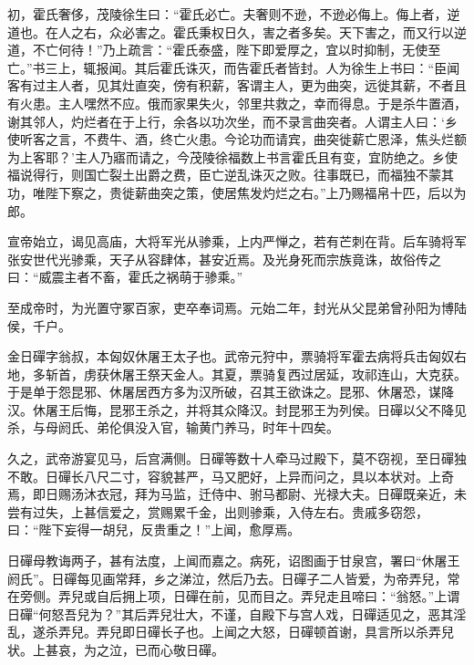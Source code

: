 \documentclass[12pt,UTF8]{ctexbook}
\begin{document}
初，霍氏奢侈，茂陵徐生曰：“霍氏必亡。夫奢则不逊，不逊必侮上。侮上者，逆道也。在人之右，众必害之。霍氏秉权日久，害之者多矣。天下害之，而又行以逆道，不亡何待！”乃上疏言：“霍氏泰盛，陛下即爱厚之，宜以时抑制，无使至亡。”书三上，辄报闻。其后霍氏诛灭，而告霍氏者皆封。人为徐生上书曰：“臣闻客有过主人者，见其灶直突，傍有积薪，客谓主人，更为曲突，远徙其薪，不者且有火患。主人嘿然不应。俄而家果失火，邻里共救之，幸而得息。于是杀牛置酒，谢其邻人，灼烂者在于上行，余各以功次坐，而不录言曲突者。人谓主人曰：‘乡使听客之言，不费牛、酒，终亡火患。今论功而请宾，曲突徙薪亡恩泽，焦头烂额为上客耶？’主人乃寤而请之，今茂陵徐福数上书言霍氏且有变，宜防绝之。乡使福说得行，则国亡裂土出爵之费，臣亡逆乱诛灭之败。往事既已，而福独不蒙其功，唯陛下察之，贵徙薪曲突之策，使居焦发灼烂之右。”上乃赐福帛十匹，后以为郎。



宣帝始立，谒见高庙，大将军光从骖乘，上内严惮之，若有芒刺在背。后车骑将军张安世代光骖乘，天子从容肆体，甚安近焉。及光身死而宗族竟诛，故俗传之曰：“威震主者不畜，霍氏之祸萌于骖乘。”



至成帝时，为光置守冢百家，吏卒奉词焉。元始二年，封光从父昆弟曾孙阳为博陆侯，千户。



金日磾字翁叔，本匈奴休屠王太子也。武帝元狩中，票骑将军霍去病将兵击匈奴右地，多斩首，虏获休屠王祭天金人。其夏，票骑复西过居延，攻祁连山，大克获。于是单于怨昆邪、休屠居西方多为汉所破，召其王欲诛之。昆邪、休屠恐，谋降汉。休屠王后悔，昆邪王杀之，并将其众降汉。封昆邪王为列侯。日磾以父不降见杀，与母阏氏、弟伦俱没入官，输黄门养马，时年十四矣。



久之，武帝游宴见马，后宫满侧。日磾等数十人牵马过殿下，莫不窃视，至日磾独不敢。日磾长八尺二寸，容貌甚严，马又肥好，上异而问之，具以本状对。上奇焉，即日赐汤沐衣冠，拜为马监，迁侍中、驸马都尉、光禄大夫。日磾既亲近，未尝有过失，上甚信爱之，赏赐累千金，出则骖乘，入侍左右。贵戚多窃怨，曰：“陛下妄得一胡兒，反贵重之！”上闻，愈厚焉。



日磾母教诲两子，甚有法度，上闻而嘉之。病死，诏图画于甘泉宫，署曰“休屠王阏氏”。日磾每见画常拜，乡之涕泣，然后乃去。日磾子二人皆爱，为帝弄兒，常在旁侧。弄兒或自后拥上项，日磾在前，见而目之。弄兒走且啼曰：“翁怒。”上谓日磾“何怒吾兒为？”其后弄兒壮大，不谨，自殿下与宫人戏，日磾适见之，恶其淫乱，遂杀弄兒。弄兒即日磾长子也。上闻之大怒，日磾顿首谢，具言所以杀弄兒状。上甚哀，为之泣，已而心敬日磾。
\end{document}
